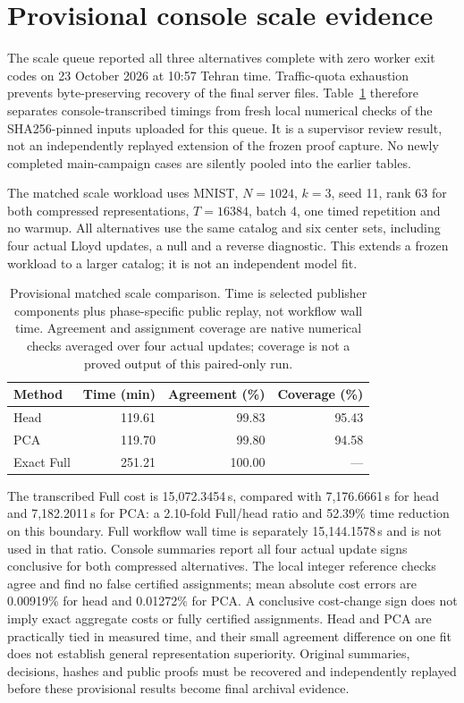 \section{Provisional console scale evidence}\label{sec:scale-console}
The scale queue reported all three alternatives complete with zero worker exit
codes on 23 October 2026 at 10:57 Tehran time. Traffic-quota exhaustion prevents
byte-preserving recovery of the final server files. Table~\ref{tab:scale-console}
therefore separates console-transcribed timings from fresh local numerical
checks of the SHA256-pinned inputs uploaded for this queue. It is a supervisor
review result, not an independently replayed extension of the frozen proof
capture. No newly completed main-campaign cases are silently pooled into the
earlier tables.

The matched scale workload uses MNIST, $N=1024$, $k=3$, seed 11, rank 63 for
both compressed representations, $T=16384$, batch 4, one timed repetition and
no warmup. All alternatives use the same catalog and six center sets, including
four actual Lloyd updates, a null and a reverse diagnostic. This extends a
frozen workload to a larger catalog; it is not an independent model fit.

\begin{table}[t]
\centering
\caption{Provisional matched scale comparison. Time is selected publisher
components plus phase-specific public replay, not workflow wall time.
Agreement and assignment coverage are native numerical checks averaged over
four actual updates; coverage is not a proved output of this paired-only run.}
\label{tab:scale-console}
\small
\begin{tabular}{lrrr}
\hline
Method & Time (min) & Agreement (\%) & Coverage (\%)\\
\hline
Head & 119.61 & 99.83 & 95.43\\
PCA & 119.70 & 99.80 & 94.58\\
Exact Full & 251.21 & 100.00 & ---\\
\hline
\end{tabular}
\end{table}

The transcribed Full cost is 15,072.3454\,s, compared with 7,176.6661\,s for
head and 7,182.2011\,s for PCA: a 2.10-fold Full/head ratio and 52.39\% time
reduction on this boundary. Full workflow wall time is separately
15,144.1578\,s and is not used in that ratio. Console summaries report all four
actual update signs conclusive for both compressed alternatives. The local
integer reference checks agree and find no false certified assignments;
mean absolute cost errors are 0.00919\% for head and 0.01272\% for PCA.
A conclusive cost-change sign does not imply exact aggregate costs or fully
certified assignments. Head and PCA are practically tied in measured time,
and their small agreement difference on one fit does not establish general
representation superiority. Original summaries, decisions, hashes and public
proofs must be recovered and independently replayed before these provisional
results become final archival evidence.

